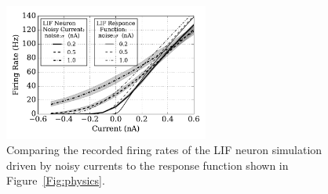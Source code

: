 	\begin{figure}
		\centering
		\includegraphics[width=0.6\textwidth]{pics_iconip/2.pdf}
		\caption{Comparing the recorded firing rates of the LIF neuron simulation driven by noisy currents to the response function shown in Figure~\ref{Fig:physics}.}
		\label{Fig:lif_curr}
	\end{figure}
	
